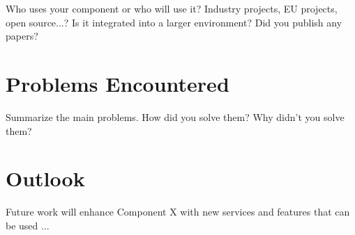 Who uses your component or who will use it? Industry projects, EU projects, open source...? Is it integrated into a larger environment? Did you publish any papers?

\section{Problems Encountered\label{sec:problems}}

Summarize the main problems. How did you solve them? Why didn't you solve them?

\section{Outlook\label{sec:outlook}}

Future work will enhance Component X with new services and features that can be used ...